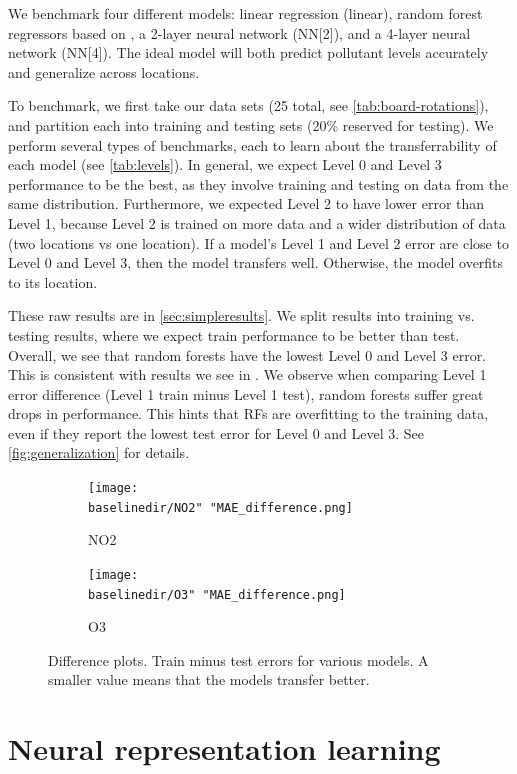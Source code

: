 \documentclass[journal abbreviation, manuscript]{copernicus}
\begin{document}
We benchmark four different models: linear regression (linear), random forest regressors based on \citep{Zimmerman2018},
a 2-layer neural network (NN[2]), and a 4-layer neural network (NN[4]). The ideal model will
both predict pollutant levels accurately and
generalize across locations.

To benchmark, we first take our data sets (25 total, see \autoref{tab:board-rotations}), and partition each into training and testing sets (20\% reserved for testing).
We perform several types of benchmarks,
each to learn about the transferrability of each model (see \autoref{tab:levels}).
In general, we expect Level 0 and Level 3 performance to be the best, as they involve training and testing on data from the same distribution. Furthermore, we expected Level 2 to have lower error than Level 1, because Level 2 is trained on more data and a wider distribution of data (two locations vs one location).
If a model's Level 1 and Level 2 error are close to Level 0 and Level 3, then the model transfers well. Otherwise, the model overfits to its location.


These raw results are in \autoref{sec:simpleresults}. 
We split results into training vs. testing
results, where we expect train performance
to be better than test.
Overall, we see that random forests have the lowest Level 0 and Level 3 error. This is consistent with results we see in \citet{Zimmerman2018}. 
We observe when comparing Level 1 error difference (Level 1 train minus Level 1 test), random forests suffer great
drops in performance.
This hints that RFs are overfitting to the training data, even if they
report the lowest test error for Level 0 and Level 3.  See \autoref{fig:generalization} for 
details.

\begin{figure}[H]
\centering
\begin{subfigure}{0.45\textwidth}
\texttt{[image: \\baselinedir/NO2" "MAE\_difference.png]}
\caption{NO2}
\end{subfigure}
\begin{subfigure}{0.45\textwidth}
\texttt{[image: \\baselinedir/O3" "MAE\_difference.png]}
\caption{O3}
\end{subfigure}
\caption{Difference plots. Train minus test errors for various models. A smaller value means that the models transfer better.}
\label{fig:generalization}
\end{figure}

\section{Neural representation learning}
\end{document}
